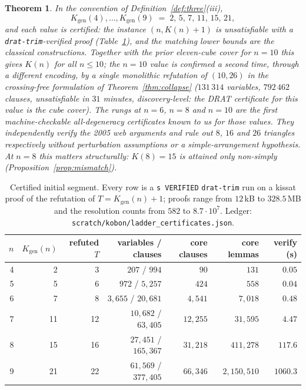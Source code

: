 \documentclass[11pt]{article}
\newtheorem{theorem}{Theorem}
\theoremstyle{definition}
\newcommand{\Kgen}{K_{\mathrm{gen}}}
\begin{document}
\begin{theorem}\label{thm:ladder}
In the convention of Definition~\ref{def:three}(iii),
\[
 \Kgen(4),\dots,\Kgen(9)\;=\;2,\,5,\,7,\,11,\,15,\,21,
\]
and each value is certified: the instance $(n,K(n)+1)$ is unsatisfiable with
a \texttt{drat-trim}-verified proof (Table~\ref{tab:ladder}), and the
matching lower bounds are the classical constructions. Together with the
prior eleven-cube cover for $n=10$ this gives $K(n)$ for all $n\le10$; the
$n=10$ value is confirmed a second time, through a different encoding, by a
single monolithic refutation of $(10,26)$ in the crossing-free formulation of
Theorem~\ref{thm:collapse} ($131\,314$ variables, $792\,462$ clauses,
unsatisfiable in $31$ minutes, discovery-level: the DRAT certificate for this
value is the cube cover).
The rungs at $n=6$, $n=8$ and $n=10$ are the first machine-checkable
all-degeneracy certificates known to us for those values. They independently
verify the 2005 web arguments \cite{Rasukaru2005} and rule out $8$, $16$ and
$26$ triangles respectively without perturbation assumptions or a
simple-arrangement hypothesis. At $n=8$ this matters structurally:
$K(8)=15$ is attained only non-simply (Proposition~\ref{prop:mismatch}).
\end{theorem}

\begin{table}[t]
\centering
\begin{tabular}{rrrrrrr}
\toprule
$n$ & $\Kgen(n)$ & refuted $T$ & variables / clauses & core clauses &
core lemmas & verify (s)\\
\midrule
4 & 2 & 3 & $207$ / $994$ & $90$ & $131$ & $0.05$\\
5 & 5 & 6 & $972$ / $5{,}257$ & $424$ & $558$ & $0.04$\\
6 & 7 & 8 & $3{,}655$ / $20{,}681$ & $4{,}541$ & $7{,}018$ & $0.48$\\
7 & 11 & 12 & $10{,}682$ / $63{,}405$ & $12{,}255$ & $31{,}595$ & $4.47$\\
8 & 15 & 16 & $27{,}451$ / $165{,}367$ & $31{,}218$ & $411{,}278$ & $117.6$\\
9 & 21 & 22 & $61{,}569$ / $377{,}405$ & $66{,}346$ & $2{,}150{,}510$ & $1060.3$\\
\bottomrule
\end{tabular}
\caption{Certified initial segment. Every row is a \texttt{s VERIFIED}
\texttt{drat-trim} run on a kissat proof of the refutation of
$T=\Kgen(n)+1$; proofs range from $12$\,kB to $328.5$\,MB and the resolution
counts from $582$ to $8.7\cdot10^7$. Ledger:
\texttt{scratch/kobon/ladder\_certificates.json}.}
\label{tab:ladder}
\end{table}
\end{document}
